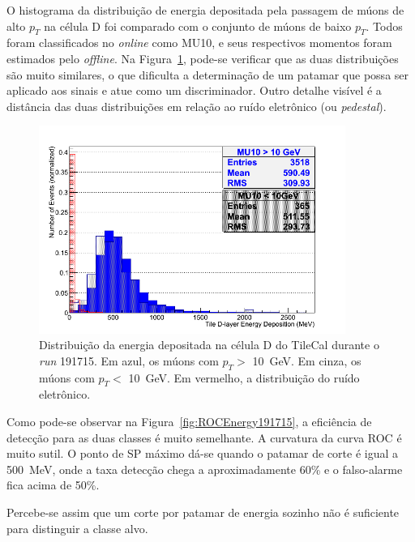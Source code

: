 O histograma da distribuição de energia depositada pela passagem de múons de
alto $p_T$ na célula D foi comparado com o conjunto de múons de baixo $p_T$.
Todos foram classificados no \emph{online} como MU10, e seus respectivos
momentos foram estimados pelo \emph{offline}. Na
Figura~\ref{fig:histEnergy191715}, pode-se verificar que as duas distribuições
são muito similares, o que dificulta a determinação de um patamar que possa ser
aplicado aos sinais e atue como um discriminador. Outro detalhe visível é  a
distância das duas distribuições em relação ao ruído eletrônico (ou
\emph{pedestal}).

\begin{figure}[htpb!]
    \centering
    \includegraphics[width=10cm]{images/sglmuon/histEnergyDeposition.png}
    \caption{Distribuição da energia depositada na célula D do TileCal durante o
    \emph{run} 191715. Em azul, os múons com $p_T >$ 10~GeV. Em cinza, os múons
    com $p_T <$ 10~GeV. Em vermelho, a distribuição do ruído eletrônico.}
    \label{fig:histEnergy191715}
\end{figure}

Como pode-se observar na Figura~\ref{fig:ROCEnergy191715}, a eficiência de
detecção para as duas classes é muito semelhante. A curvatura da curva ROC é
muito sutil. O ponto de SP máximo dá-se quando o patamar de corte é igual a
500~MeV, onde a taxa detecção chega a aproximadamente 60\% e o falso-alarme
fica acima de 50\%.

Percebe-se assim que um corte por patamar de energia sozinho não é suficiente
para distinguir a classe alvo.

